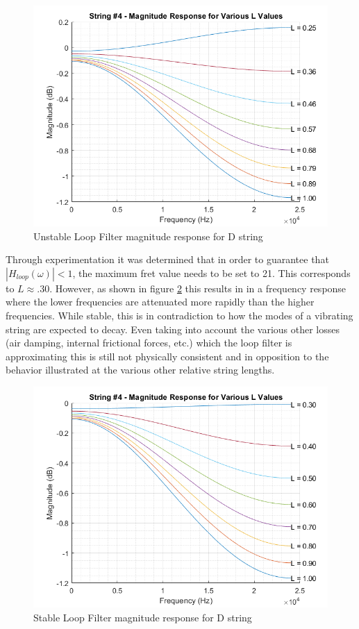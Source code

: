 \documentclass[../main.tex]{subfiles}
\begin{document}
\begin{figure}[h]
    \centering
    \includegraphics[scale=.65]{./images/plots/String 4 - Loop Filter Magnitude Response.png}
    \caption{Unstable Loop Filter magnitude response for D string}
    \label{fig:Str4LoopMag}
\end{figure}

Through experimentation it was determined that in order to guarantee that $|H_{loop}(\omega)| < 1$, the maximum fret value needs to be set to 21. This corresponds to $L \approx .30$. However, as shown in figure \ref{fig:Str4LoopMagStable} this results in in a frequency response where the lower frequencies are attenuated more rapidly than the higher frequencies. While stable, this is in contradiction to how the modes of a vibrating string are expected to decay. Even taking into account the various other losses (air damping, internal frictional forces, etc.) which the loop filter is approximating this is still not physically consistent and in opposition to the behavior illustrated at the various other relative string lengths.

\begin{figure}[h]
    \centering
    \includegraphics[scale=.65]{./images/plots/String 4 - Loop Filter Magnitude Response - stable.png}
    \caption{Stable Loop Filter magnitude response for D string}
    \label{fig:Str4LoopMagStable}
\end{figure}
\end{document}
